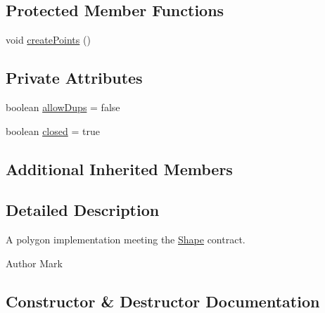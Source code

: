 \subsection*{Protected Member Functions}
\begin{DoxyCompactItemize}
\item 
void \mbox{\hyperlink{classorg_1_1newdawn_1_1slick_1_1geom_1_1_polygon_a9486424a7f53b58bcaee9bd80ecdb1f7}{create\+Points}} ()
\end{DoxyCompactItemize}
\subsection*{Private Attributes}
\begin{DoxyCompactItemize}
\item 
boolean \mbox{\hyperlink{classorg_1_1newdawn_1_1slick_1_1geom_1_1_polygon_a425e8151c71ea31ba03f5d147f9ef79a}{allow\+Dups}} = false
\item 
boolean \mbox{\hyperlink{classorg_1_1newdawn_1_1slick_1_1geom_1_1_polygon_abd01891f359ce8a9cb220f8b2b905deb}{closed}} = true
\end{DoxyCompactItemize}
\subsection*{Additional Inherited Members}


\subsection{Detailed Description}
A polygon implementation meeting the {\ttfamily \mbox{\hyperlink{classorg_1_1newdawn_1_1slick_1_1geom_1_1_shape}{Shape}}} contract.

\begin{DoxyAuthor}{Author}
Mark 
\end{DoxyAuthor}


\subsection{Constructor \& Destructor Documentation}
\mbox{\label{classorg_1_1newdawn_1_1slick_1_1geom_1_1_polygon_a3915cd4602383603e34b48c4b71d7a0a}} 
